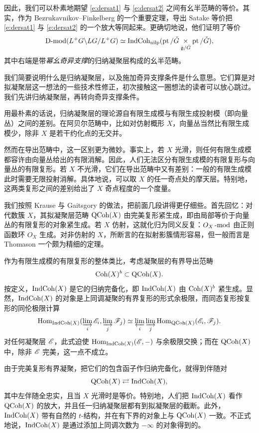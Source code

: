 因此，我们可以朴素地期望 \eqref{e:dersat1} 与 \eqref{e:dersat2} 之间有幺半范畴的等价。其实，作为 Bezrukavnikov--Finkelberg \cite{bezfinksat} 的一个重要定理，导出 Satake 等价把 \eqref{e:dersat1} 与 \eqref{e:dersat2} 的一个放大等同起来。更确切地说，他们证明了等价
\begin{equation} \label{e:dersat} \Dmod(L^+G \backslash LG / L^+G) \simeq
\ICn( \on{pt} / \cG  \underset{
\cfg / \cG} \times \on{pt} / \cG), \end{equation}
其中右端是带{\em 幂幺奇异支撑}的归纳凝聚层构成的幺半范畴。

\ssszh 我们简要说明什么是归纳凝聚层，以及施加奇异支撑条件是什么意思。它们算是对拟凝聚层这一想法的一些技术性修正，初次接触这一圈想法的读者可以放心跳过。我们先讲归纳凝聚层，再转向奇异支撑条件。

用最朴素的话说，归纳凝聚层的理论源自有限生成模与有限生成投射模（即向量丛）之间的差别。在阿贝尔范畴中，比如对仿射概形 $X$，向量丛当然比有限生成模少，除非 $X$ 是若干约化点的无交并。

然而在导出范畴中，这一区别更为微妙。事实上，若 $X$ 光滑，则任何有限生成模都容许由向量丛给出的有限消解。因此，人们无法区分有限生成模的有限复形与向量丛的有限复形。若 $X$ 不光滑，它们在导出范畴中又有差别：一般的有限生成模此时需要无限投射消解。具体地说，可以取 $X$ 的任一奇点处的摩天层。特别地，这两类复形之间的差别给出了 $X$ 奇点程度的一个度量。

\ssszh 我们按照 Krause \cite{krause} 与 Gaitsgory \cite{gaitsgoryindcoh} 的做法，把前面几段讲得更仔细些。首先回忆：对代数簇 $X$，其拟凝聚层范畴 $\QCoh(X)$ 由完美复形紧生成，即由局部等价于向量丛的有限复形的对象紧生成。若 $X$ 仿射，这就化归为同义反复：$O_X\mod$ 由正则函数环 $O_X$ 生成。对非仿射的 $X$，所断言的在拟射影簇情形容易，但一般而言是 Thomason \cite{thomasontrobaugh} 一个颇为精细的定理。

作为有限生成模的有限复形的整体类比，考虑凝聚层的有界导出范畴
$$\on{Coh}(X)^b \subset \QCoh(X).$$ 按定义，$\on{IndCoh}(X)$ 是它的归纳完备化，即 $\on{IndCoh}(X)$ 由 $\on{Coh}(X)^b$ 紧生成。显然，$\on{IndCoh}(X)$ 的对象是上同调凝聚的有界复形的形式余极限，而同态复形按复形的同伦极限计算
\[
\Hom_{\on{IndCoh}(X)}( \varinjlim_i \sE_i, \varinjlim_j \sF_j) \simeq
\varprojlim_i
\varinjlim_j \Hom_{\on{QCoh}(X)}( \sE_i, \sF_j).
\]
对任何凝聚层 $\sE$，此式迫使 $\Hom_{\on{IndCoh}(X)}(\sE, -)$ 与余极限交换；而在 $\QCoh(X)$ 中，除非 $\sE$ 完美，这一点不成立。

由于完美复形有界凝聚，把它们的包含函子作归纳完备化，就得到伴随对
\[
\on{QCoh}(X) \rightleftarrows \on{IndCoh}(X),
\]
其中左伴随全忠实，且当 $X$ 光滑时是等价。特别地，人们把 $\on{IndCoh}(X)$ 看作 $\on{QCoh}(X)$ 的放大，并且任一归纳凝聚层都有到拟凝聚层的截断。此外，$\on{IndCoh}(X)$ 带有自然的 $t$-结构，并在有下界的对象上与 $\on{QCoh}(X)$ 一致。不正式地说，$\on{IndCoh}(X)$ 是通过添加上同调次数为 $-\infty$ 的对象得到的。

